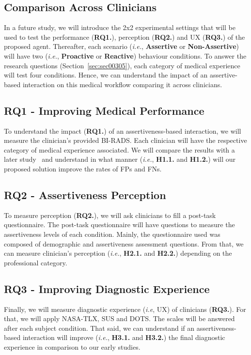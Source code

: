 \subsection{Comparison Across Clinicians}
\label{sec:sec00704}

In a future study, we will introduce the 2x2 experimental settings that will be used to test the performance ({\bf RQ1.}), perception ({\bf RQ2.}) and UX ({\bf RQ3.}) of the proposed agent.
Thereafter, each scenario ({\it i.e.}, {\bf Assertive} or {\bf Non-Assertive}) will have two ({\it i.e.}, {\bf Proactive} or {\bf Reactive}) behaviour conditions.
To answer the research questions (Section~\ref{sec:sec00305}), each category of medical experience will test four conditions.
Hence, we can understand the impact of an assertive-based interaction on this medical workflow comparing it across clinicians.

\subsection{RQ1 - Improving Medical Performance}
\label{sec:sec00705}

To understand the impact ({\bf RQ1.}) of an assertiveness-based interaction, we will measure the clinician's provided BI-RADS.
Each clinician will have the respective category of medical experience associated.
We will compare the results with a later study~\cite{https://doi.org/10.13140/rg.2.2.16566.14403/1} and understand in what manner ({\it i.e.}, {\bf H1.1.} and {\bf H1.2.}) will our proposed solution improve the rates of FPs and FNs.

\subsection{RQ2 - Assertiveness Perception}
\label{sec:sec00706}

To measure perception ({\bf RQ2.}), we will ask clinicians to fill a post-task questionnaire.
The post-task questionnaire will have questions to measure the assertiveness levels of each condition.
Mainly, the questionnaire used was composed of demographic and assertiveness assessment questions.
From that, we can measure clinician's perception ({\it i.e.}, {\bf H2.1.} and {\bf H2.2.}) depending on the professional category.

\subsection{RQ3 - Improving Diagnostic Experience}
\label{sec:sec00707}

Finally, we will measure diagnostic experience ({\it i.e}, UX) of clinicians ({\bf RQ3.}).
For that, we will apply NASA-TLX, SUS and DOTS.
The scales will be answered after each subject condition.
That said, we can understand if an assertiveness-based interaction will improve ({\it i.e.}, {\bf H3.1.} and {\bf H3.2.}) the final diagnostic experience in comparison to our early studies.